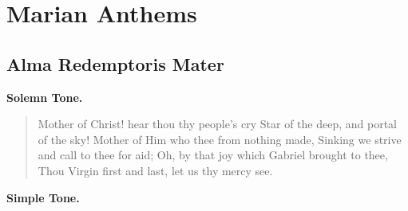 \chapter{Marian Anthems}
{
\def\nogabcbreaks{Tone}
\newcommand{\afterant}{
\ifx\note\undefined\else%
\textit{\note}

\medskip
\fi
\sloppy
\begin{columns}
\versicle{\vlatin}{\venglish}
\response{\rlatin}{\renglish}
\colchunk{}
\colplacechunks{}
\colchunk{\hspace*{3em}Orémus.}\colchunk{\hspace*{3em}Let us pray,}
\colplacechunks{}
\prayer{\prayerlatin}{\prayerenglish}
\end{columns}
\ifx\notetwo\undefined\else%
\bigskip

\needspace{5\baselineskip}
\textit{\notetwo}

\medskip
\begin{columns}
\versicle{\vlatintwo}{\venglishtwo}
\response{\rlatintwo}{\renglishtwo}
\colchunk{}
\colplacechunks{}
\colchunk{\hspace*{3em}Orémus.}\colchunk{\hspace*{3em}Let us pray,}
\colplacechunks{}
\prayer{\prayerlatintwo}{\prayerenglishtwo}
\end{columns}
\fi
}

\def\gabcfolder{../MarianAntiphons}

\section{Alma Redemptoris Mater}
\begin{center}\textbf{Solemn Tone.}\end{center}
\begin{quote}{Mother of Christ! hear thou thy people's cry
Star of the deep, and portal of the sky!
Mother of Him who thee from nothing made,
Sinking we strive and call to thee for aid;
Oh, by that joy which Gabriel brought to thee,
Thou Virgin first and last, let us thy mercy see.}\end{quote}
\begin{center}\textbf{Simple Tone.}\end{center}

}
